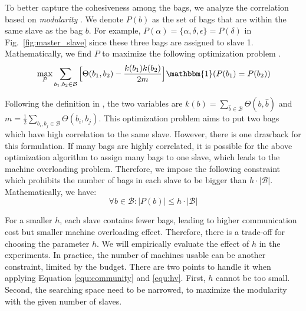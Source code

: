 To better capture the cohesiveness among the bags, we analyze the correlation based on \textit{modularity} \cite{newman2004analysis}. 
We denote $P(b)$ as the set of bags that are within the same slave as the bag $b$. For example, $P(\alpha)=\{\alpha, \delta,\epsilon\}=P(\delta)$ in Fig.~\ref{fig:master_slave} since these three bags are assigned to slave 1. Mathematically, we find $P$ to maximize the following optimization problem \cite{newman2004analysis}.
%
\begin{equation}
\label{equ:community}
\begin{aligned}
&
& & \max\limits_P \sum_{b_1, b_2\in \mathcal{B}}\Big[\Theta(b_1,b_2)-\frac{k(b_1)k(b_2)}{2m}\Big]\mathbbm{1}(P(b_1)=P(b_2)) %
\end{aligned}
\end{equation}

Following the definition in \cite{newman2004analysis}, the two variables are $k(b)=\sum_{\hat{b}\in \mathcal{B}}\Theta(b, \hat{b})$ and $m=\frac{1}{2}\sum_{b_i,b_j \in \mathcal{B}}\Theta(b_i,b_j)$. 
This optimization problem aims to put two bags which have high correlation to the same slave. However, there is one drawback for this formulation. If many bags are highly correlated,
it is possible for the above optimization algorithm to assign many bags to one slave, which leads to the machine overloading problem. Therefore, we impose the following constraint which prohibits the number of bags in each slave to be bigger than $h\cdot |\mathcal{B}|$. Mathematically, we have:
\begin{equation}
\forall b\in \mathcal{B}: |P(b)|\leq h\cdot |\mathcal{B}|
\label{equ:hv}
\end{equation}

For a smaller $h$, each slave contains fewer bags, leading to higher communication cost but smaller machine overloading effect. Therefore, there is a trade-off for choosing the parameter $h$. We will empirically evaluate the effect of $h$ in the experiments. 
In practice, the number of machines usable can be another constraint, limited by the budget. There are two points to handle it when applying Equation \ref{equ:community} and \ref{equ:hv}. First, $h$ cannot be too small. Second, the searching space need to be narrowed, to maximize the modularity with the given number of slaves.

